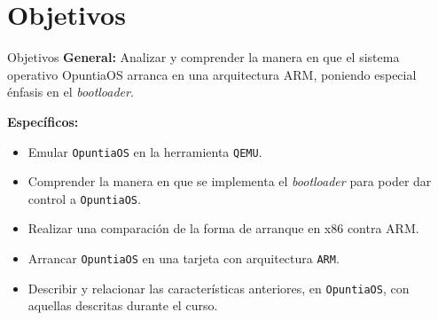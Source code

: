 \section{Objetivos}
\begin{frame}{Objetivos}
	\textbf{General:}
	Analizar y comprender la manera en que el sistema operativo OpuntiaOS arranca en 
	una arquitectura ARM, poniendo especial énfasis en el \textit{bootloader}.
	
	
	
	\textbf{Específicos:}
	\begin{itemize} \setlength\itemsep{0pt}
		\item Emular \texttt{OpuntiaOS} en la herramienta \texttt{QEMU}.
		\item Comprender la manera en que se implementa el \textit{bootloader} 
		para poder dar control a \texttt{OpuntiaOS}.
		\item Realizar una comparación de la forma  de arranque en x86 contra ARM.
		\item Arrancar \texttt{OpuntiaOS} en una tarjeta con arquitectura \texttt{ARM}.
		\item Describir y relacionar las características anteriores, en \texttt{OpuntiaOS}, con aquellas descritas
		durante el curso.
	\end{itemize}
\end{frame}


